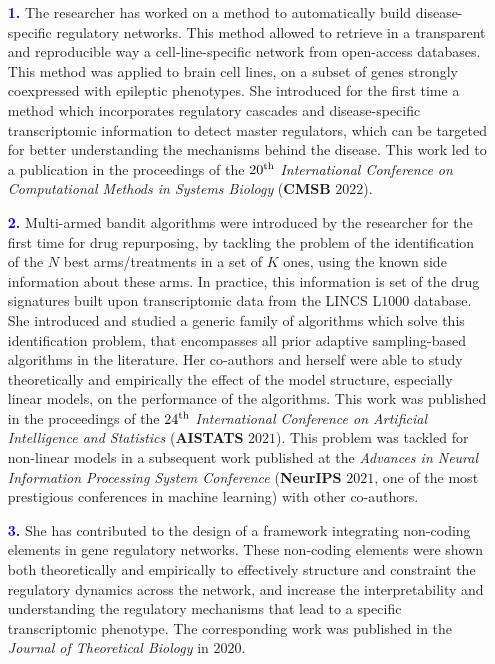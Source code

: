 \documentclass[11pt,a4paper,sans]{moderncv}
\begin{document}
\begin{enumerate}
    \item[\textbf{\textcolor{blue}{1.}}] The researcher has worked on a method to automatically build disease-specific regulatory networks. This method allowed to retrieve in a transparent and reproducible way a cell-line-specific network from open-access databases. This method was applied to brain cell lines, on a subset of genes strongly coexpressed with epileptic phenotypes. She introduced for the first time a method which incorporates regulatory cascades and disease-specific transcriptomic information to detect master regulators, which can be targeted for better understanding the mechanisms behind the disease. This work led to a publication in the proceedings of the $20^\textnormal{th}$ \textit{International Conference on Computational Methods in Systems Biology} (\textbf{CMSB} $2022$).
    \item[\textbf{\textcolor{blue}{2.}}] Multi-armed bandit algorithms were introduced by the researcher for the first time for drug repurposing, by tackling the problem of the identification of the $N$ best arms/treatments in a set of $K$ ones, using the known side information about these arms. In practice, this information is set of the drug signatures built upon transcriptomic data from the LINCS L$1000$ database. She introduced and studied a generic family of algorithms which solve this identification problem, that encompasses all prior adaptive sampling-based algorithms in the literature. Her co-authors and herself were able to study theoretically and empirically the effect of the model structure, especially linear models, on the performance of the algorithms. This work was published in the proceedings of the $24^\textnormal{th}$ \textit{International Conference on Artificial Intelligence and Statistics} (\textbf{AISTATS} $2021$). This problem was tackled for non-linear models in a subsequent work published at the \textit{Advances in Neural Information Processing System Conference} (\textbf{NeurIPS} $2021$, one of the most prestigious conferences in machine learning) with other co-authors.
    \item[\textbf{\textcolor{blue}{3.}}] She has contributed to the design of a framework integrating non-coding elements in gene regulatory networks. These non-coding elements were shown both theoretically and empirically to effectively structure and constraint the regulatory dynamics across the network, and increase the interpretability and understanding the regulatory mechanisms that lead to a specific transcriptomic phenotype. The corresponding work was published in the \textit{Journal of Theoretical Biology} in $2020$.
\end{enumerate}
\vspace{-0.1cm}
\end{document}
